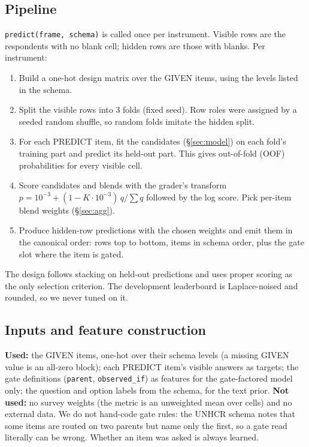 \documentclass{article}
\begin{document}
\subsection{Pipeline}
\label{sec:pipeline}
\texttt{predict(frame, schema)} is called once per instrument. Visible rows are the respondents with no blank cell; hidden rows are those with blanks. Per instrument:
\begin{enumerate}[leftmargin=*,itemsep=1pt]
  \item Build a one-hot design matrix over the GIVEN items, using the levels listed in the schema.
  \item Split the visible rows into 3 folds (fixed seed). Row roles were assigned by a seeded random shuffle, so random folds imitate the hidden split.
  \item For each PREDICT item, fit the candidates (\S\ref{sec:model}) on each fold's training part and predict its held-out part. This gives out-of-fold (OOF) probabilities for every visible cell.
  \item Score candidates and blends with the grader's transform $p = 10^{-3} + (1-K\cdot10^{-3})\,q/\sum q$ followed by the log score. Pick per-item blend weights (\S\ref{sec:agg}).
  \item Produce hidden-row predictions with the chosen weights and emit them in the canonical order: rows top to bottom, items in schema order, plus the gate slot where the item is gated.
\end{enumerate}
The design follows stacking on held-out predictions \citep{wolpert1992stacked} and uses proper scoring \citep{gneiting2007strictly} as the only selection criterion. The development leaderboard is Laplace-noised and rounded, so we never tuned on it.

\subsection{Inputs and feature construction}
\textbf{Used:} the GIVEN items, one-hot over their schema levels (a missing GIVEN value is an all-zero block); each PREDICT item's visible answers as targets; the gate definitions (\texttt{parent}, \texttt{observed\_if}) as features for the gate-factored model only; the question and option labels from the schema, for the text prior. \textbf{Not used:} no survey weights (the metric is an unweighted mean over cells) and no external data. We do not hand-code gate rules: the UNHCR schema notes that some items are routed on two parents but name only the first, so a gate read literally can be wrong. Whether an item was asked is always learned.
\end{document}
